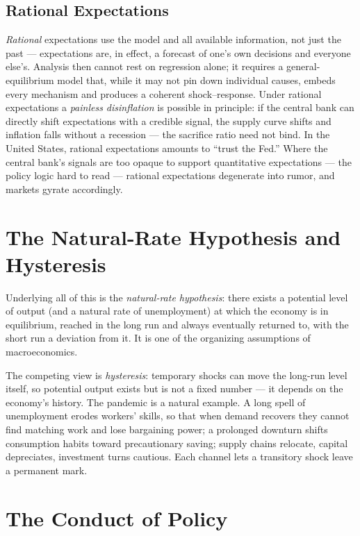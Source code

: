 \subsection{Rational Expectations}

\emph{Rational} expectations use the model and all available information, not just the past --- expectations are, in effect, a forecast of one's own decisions and everyone else's. Analysis then cannot rest on regression alone; it requires a general-equilibrium model that, while it may not pin down individual causes, embeds every mechanism and produces a coherent shock--response. Under rational expectations a \emph{painless disinflation} is possible in principle: if the central bank can directly shift expectations with a credible signal, the supply curve shifts and inflation falls without a recession --- the sacrifice ratio need not bind. In the United States, rational expectations amounts to ``trust the Fed.'' Where the central bank's signals are too opaque to support quantitative expectations --- the policy logic hard to read --- rational expectations degenerate into rumor, and markets gyrate accordingly.

\section{The Natural-Rate Hypothesis and Hysteresis}

Underlying all of this is the \emph{natural-rate hypothesis}: there exists a potential level of output (and a natural rate of unemployment) at which the economy is in equilibrium, reached in the long run and always eventually returned to, with the short run a deviation from it. It is one of the organizing assumptions of macroeconomics.

The competing view is \emph{hysteresis}: temporary shocks can move the long-run level itself, so potential output exists but is not a fixed number --- it depends on the economy's history. The pandemic is a natural example. A long spell of unemployment erodes workers' skills, so that when demand recovers they cannot find matching work and lose bargaining power; a prolonged downturn shifts consumption habits toward precautionary saving; supply chains relocate, capital depreciates, investment turns cautious. Each channel lets a transitory shock leave a permanent mark.

\section{The Conduct of Policy}

